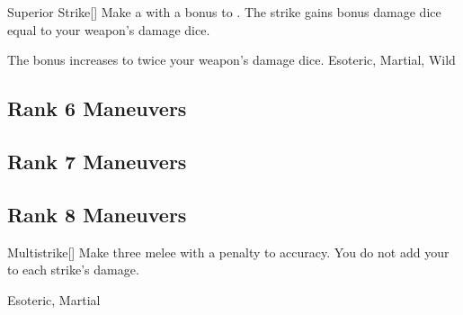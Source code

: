 \lowercase{\hypertarget{maneuver:Superior Strike}{}}\label{maneuver:Superior Strike}
\hypertarget{maneuver:Superior Strike}{}
\begin{freeability}[Rank 5]{Superior Strike}[]
Make a  with a  bonus to .
The strike gains bonus damage dice equal to your weapon's damage dice.

\rankline
{} The bonus increases to twice your weapon's damage dice.
 Esoteric, Martial, Wild
\end{freeability}
\vspace{0.25em}


\subsection{Rank 6 Maneuvers}
\subsection{Rank 7 Maneuvers}
\subsection{Rank 8 Maneuvers}

\lowercase{\hypertarget{maneuver:Multistrike}{}}\label{maneuver:Multistrike}
\hypertarget{maneuver:Multistrike}{}
\begin{freeability}[Rank 8]{Multistrike}[]
Make three melee  with a  penalty to accuracy.
You do not add your  to each strike's damage.


 Esoteric, Martial
\end{freeability}
\vspace{0.25em}

